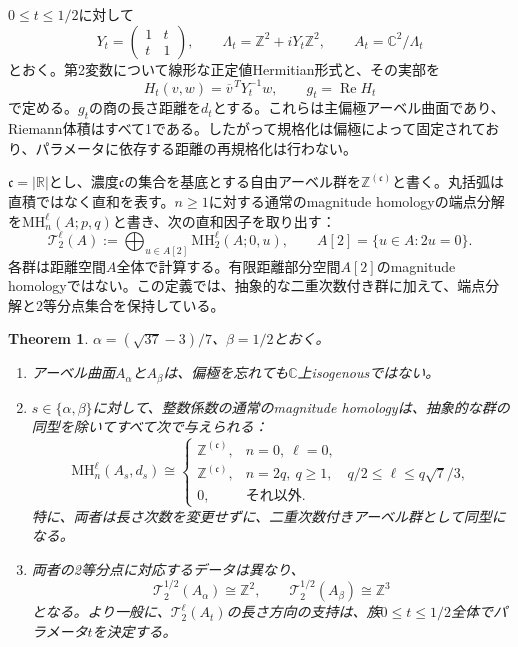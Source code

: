 \documentclass[12pt]{amsart}
\newcommand{\TheoremName}{Theorem}
\newtheorem{thm}{\TheoremName}[section]
\theoremstyle{definition}
\theoremstyle{remark}
\numberwithin{equation}{section}
\newcommand{\R}{\mathbb{R}}
\newcommand{\Z}{\mathbb{Z}}
\newcommand{\C}{\mathbb{C}}
\newcommand{\MH}{\mathrm{MH}}
\begin{document}
$0\leq t\leq1/2$に対して
\begin{equation}\label{ja:family}
Y_t=\begin{pmatrix}1&t\\t&1\end{pmatrix},\qquad
\Lambda_t=\Z^2+iY_t\Z^2,\qquad A_t=\C^2/\Lambda_t
\end{equation}
とおく。第2変数について線形な正定値Hermitian形式と、その実部を
\begin{equation}\label{ja:metric}
H_t(v,w)=\overline v^{\,T}Y_t^{-1}w,\qquad
g_t=\operatorname{Re}H_t
\end{equation}
で定める。$g_t$の商の長さ距離を$d_t$とする。これらは主偏極アーベル曲面であり、Riemann体積はすべて1である。したがって規格化は偏極によって固定されており、パラメータに依存する距離の再規格化は行わない。

$\mathfrak c=|\R|$とし、濃度$\mathfrak c$の集合を基底とする自由アーベル群を$\Z^{(\mathfrak c)}$と書く。丸括弧は直積ではなく直和を表す。$n\geq1$に対する通常のmagnitude homologyの端点分解を$\MH_n^\ell(A;p,q)$と書き、次の直和因子を取り出す：
\begin{equation}\label{ja:torsiondefinition}
\mathcal T_2^\ell(A):=
\bigoplus_{u\in A[2]}\MH_2^\ell(A;0,u),
\qquad A[2]=\{u\in A:2u=0\}.
\end{equation}
各群は距離空間$A$全体で計算する。有限距離部分空間$A[2]$のmagnitude homologyではない。この定義では、抽象的な二重次数付き群に加えて、端点分解と2等分点集合を保持している。

\begin{thm}\label{ja:main}
$\alpha=(\sqrt{37}-3)/7$、$\beta=1/2$とおく。
\begin{enumerate}
\item アーベル曲面$A_\alpha$と$A_\beta$は、偏極を忘れても$\C$上isogenousではない。
\item $s\in\{\alpha,\beta\}$に対して、整数係数の通常のmagnitude homologyは、抽象的な群の同型を除いてすべて次で与えられる：
\begin{equation}\label{ja:mainformula}
\MH_n^\ell(A_s,d_s)\cong
\begin{cases}
\Z^{(\mathfrak c)},&n=0,\ \ell=0,\\
\Z^{(\mathfrak c)},&n=2q,\ q\geq1,\quad
q/2\leq\ell\leq q\sqrt7/3,\\
0,&\text{それ以外}.
\end{cases}
\end{equation}
特に、両者は長さ次数を変更せずに、二重次数付きアーベル群として同型になる。
\item 両者の2等分点に対応するデータは異なり、
\begin{equation}\label{ja:distinguish}
\mathcal T_2^{1/2}(A_\alpha)\cong\Z^2,
\qquad \mathcal T_2^{1/2}(A_\beta)\cong\Z^3
\end{equation}
となる。より一般に、$\mathcal T_2^\ell(A_t)$の長さ方向の支持は、族$0\leq t\leq1/2$全体でパラメータ$t$を決定する。
\end{enumerate}
\end{thm}
\end{document}
